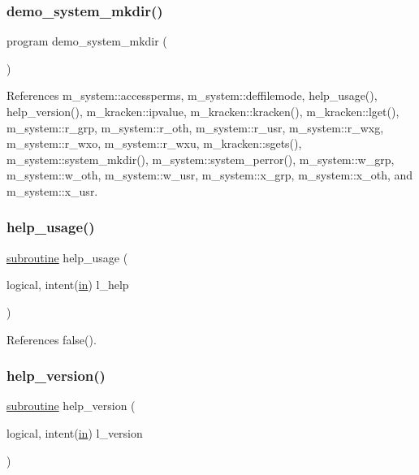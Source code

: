 \subsubsection{\texorpdfstring{demo\+\_\+system\+\_\+mkdir()}{demo\_system\_mkdir()}}
{\footnotesize\ttfamily program demo\+\_\+system\+\_\+mkdir (\begin{DoxyParamCaption}{ }\end{DoxyParamCaption})}



References m\+\_\+system\+::accessperms, m\+\_\+system\+::deffilemode, help\+\_\+usage(), help\+\_\+version(), m\+\_\+kracken\+::ipvalue, m\+\_\+kracken\+::kracken(), m\+\_\+kracken\+::lget(), m\+\_\+system\+::r\+\_\+grp, m\+\_\+system\+::r\+\_\+oth, m\+\_\+system\+::r\+\_\+usr, m\+\_\+system\+::r\+\_\+wxg, m\+\_\+system\+::r\+\_\+wxo, m\+\_\+system\+::r\+\_\+wxu, m\+\_\+kracken\+::sgets(), m\+\_\+system\+::system\+\_\+mkdir(), m\+\_\+system\+::system\+\_\+perror(), m\+\_\+system\+::w\+\_\+grp, m\+\_\+system\+::w\+\_\+oth, m\+\_\+system\+::w\+\_\+usr, m\+\_\+system\+::x\+\_\+grp, m\+\_\+system\+::x\+\_\+oth, and m\+\_\+system\+::x\+\_\+usr.

\mbox{\label{__mkdir_8f90_a3e09a3b52ee8fb04eeb93fe5761626a8}} 
\subsubsection{\texorpdfstring{help\+\_\+usage()}{help\_usage()}}
{\footnotesize\ttfamily \hyperlink{M__stopwatch_83_8txt_acfbcff50169d691ff02d4a123ed70482}{subroutine} help\+\_\+usage (\begin{DoxyParamCaption}\item[{logical, intent(\hyperlink{M__journal_83_8txt_afce72651d1eed785a2132bee863b2f38}{in})}]{l\+\_\+help }\end{DoxyParamCaption})}



References false().

\mbox{\label{__mkdir_8f90_a39c21619b08a3c22f19e2306efd7f766}} 
\subsubsection{\texorpdfstring{help\+\_\+version()}{help\_version()}}
{\footnotesize\ttfamily \hyperlink{M__stopwatch_83_8txt_acfbcff50169d691ff02d4a123ed70482}{subroutine} help\+\_\+version (\begin{DoxyParamCaption}\item[{logical, intent(\hyperlink{M__journal_83_8txt_afce72651d1eed785a2132bee863b2f38}{in})}]{l\+\_\+version }\end{DoxyParamCaption})}



